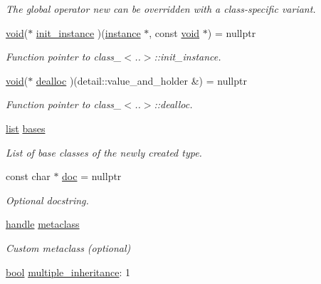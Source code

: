 \begin{DoxyCompactItemize}
\begin{DoxyCompactList}\small\item\em The global operator new can be overridden with a class-\/specific variant. \end{DoxyCompactList}\item 
\mbox{\hyperlink{_s_d_l__opengles2__gl2ext_8h_ae5d8fa23ad07c48bb609509eae494c95}{void}}($\ast$ \mbox{\hyperlink{structtype__record_ad1d597c02ba9ac676f2c98c96c3ccc54}{init\+\_\+instance}} )(\mbox{\hyperlink{structinstance}{instance}} $\ast$, const \mbox{\hyperlink{_s_d_l__opengles2__gl2ext_8h_ae5d8fa23ad07c48bb609509eae494c95}{void}} $\ast$) = nullptr
\begin{DoxyCompactList}\small\item\em Function pointer to class\+\_\+$<$..$>$\+::init\+\_\+instance. \end{DoxyCompactList}\item 
\mbox{\hyperlink{_s_d_l__opengles2__gl2ext_8h_ae5d8fa23ad07c48bb609509eae494c95}{void}}($\ast$ \mbox{\hyperlink{structtype__record_ab2b5fe93f5c5d047014164e931c53c41}{dealloc}} )(detail\+::value\+\_\+and\+\_\+holder \&) = nullptr
\begin{DoxyCompactList}\small\item\em Function pointer to class\+\_\+$<$..$>$\+::dealloc. \end{DoxyCompactList}\item 
\mbox{\hyperlink{classlist}{list}} \mbox{\hyperlink{structtype__record_ae84dc75887eb2af0bd2b3d1bcfe5496c}{bases}}
\begin{DoxyCompactList}\small\item\em List of base classes of the newly created type. \end{DoxyCompactList}\item 
const char $\ast$ \mbox{\hyperlink{structtype__record_ab343e48279172cd6f8ed5a25036bd02b}{doc}} = nullptr
\begin{DoxyCompactList}\small\item\em Optional docstring. \end{DoxyCompactList}\item 
\mbox{\hyperlink{classhandle}{handle}} \mbox{\hyperlink{structtype__record_a07699840bb125ef8d7d17122975c4d17}{metaclass}}
\begin{DoxyCompactList}\small\item\em Custom metaclass (optional) \end{DoxyCompactList}\item 
\mbox{\hyperlink{asdl_8h_af6a258d8f3ee5206d682d799316314b1}{bool}} \mbox{\hyperlink{structtype__record_a13c1d8df682426b1de648c1231979231}{multiple\+\_\+inheritance}}\+: 1

\end{DoxyCompactItemize}
